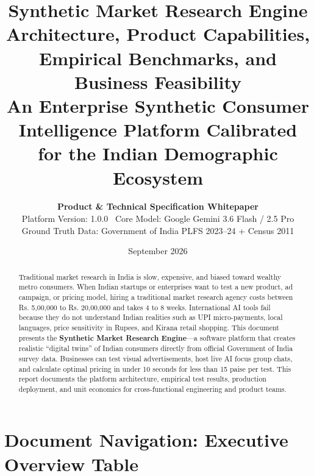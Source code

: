 \documentclass[11pt,a4paper]{article}
\title{
  \vspace{-1.2cm}
  {\Huge\textbf{\color{brandnavy}Synthetic Market Research Engine}}\\[0.3cm]
  {\Large\textbf{\color{brandblue}Architecture, Product Capabilities, Empirical Benchmarks, and Business Feasibility}}\\[0.2cm]
  {\normalsize An Enterprise Synthetic Consumer Intelligence Platform Calibrated for the Indian Demographic Ecosystem}
}
\author{
  \textbf{Product \& Technical Specification Whitepaper}\\
  Platform Version: 1.0.0 \textbullet\ Core Model: Google Gemini 3.6 Flash / 2.5 Pro\\
  Ground Truth Data: Government of India PLFS 2023--24 + Census 2011
}
\date{September 2026}
\begin{document}
\maketitle

\begin{abstract}
Traditional market research in India is slow, expensive, and biased toward wealthy metro consumers. When Indian startups or enterprises want to test a new product, ad campaign, or pricing model, hiring a traditional market research agency costs between Rs. 5,00,000 to Rs. 20,00,000 and takes 4 to 8 weeks. International AI tools fail because they do not understand Indian realities such as UPI micro-payments, local languages, price sensitivity in Rupees, and Kirana retail shopping. This document presents the \textbf{Synthetic Market Research Engine}---a software platform that creates realistic ``digital twins'' of Indian consumers directly from official Government of India survey data. Businesses can test visual advertisements, host live AI focus group chats, and calculate optimal pricing in under 10 seconds for less than 15 paise per test. This report documents the platform architecture, empirical test results, production deployment, and unit economics for cross-functional engineering and product teams.
\end{abstract}

\vspace{0.2cm}

\section*{Document Navigation: Executive Overview Table}
\end{document}
